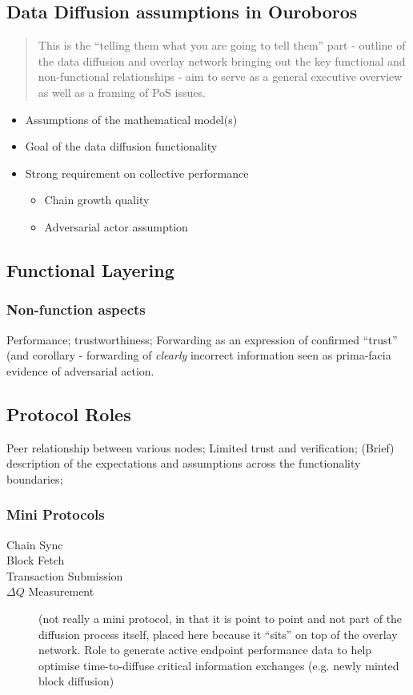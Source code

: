 \documentclass{report}
\theoremstyle{definition}{
  \newtheorem{lemma}{Lemma}[section] %
  \newtheorem{definition}[lemma]{Definition}
}
\theoremstyle{theorem}{
  \newtheorem{invariant}[lemma]{Invariant}
  \newtheorem{proofobligation}[lemma]{Proof Obligation}
}
\numberwithin{equation}{lemma}
\begin{document}
\subsection{Data Diffusion assumptions in Ouroboros}
\begin{quote}
  This is the ``telling them what you are going to tell them'' part -
  outline of the data diffusion and overlay network bringing out the
  key functional and non-functional relationships - aim to serve as a
  general executive overview as well as a framing of PoS issues.
\end{quote}
\begin{itemize}
  \item Assumptions of the mathematical model(s)
  \item Goal of the data diffusion functionality
  \item Strong requirement on collective performance
  \begin{itemize}
    \item Chain growth quality
    \item Adversarial actor assumption
  \end{itemize}
\end{itemize}
\subsection{Functional Layering}

\subsubsection{Non-function aspects}
Performance; trustworthiness; Forwarding as an expression of confirmed
``trust'' (and corollary - forwarding of \emph{clearly} incorrect information
seen as prima-facia evidence of adversarial action.
\subsection{Protocol Roles}
Peer relationship between various nodes; Limited trust and
verification; (Brief) description of the expectations and assumptions across
the functionality boundaries; 

\subsubsection{Mini Protocols}
\begin{description}
\item[Chain Sync]
\item[Block Fetch]
\item[Transaction Submission]
\item[$\Delta Q$ Measurement] (not really a mini protocol, in that it
  is point to point and not part of the diffusion process itself,
  placed here because it ``sits'' on top of the overlay network. Role
  to generate active endpoint performance data to help optimise
  time-to-diffuse critical information exchanges (e.g. newly minted
  block diffusion)
\end{description}  
\end{document}
